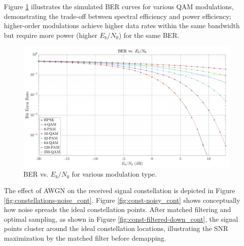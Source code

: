 Figure \ref{fig:ber-mod_cont} illustrates the simulated BER curves for various QAM modulations, demonstrating the trade-off between spectral efficiency and power efficiency; higher-order modulations achieve higher data rates within the same bandwidth but require more power (higher $E_b/N_0$) for the same BER.

\begin{figure}[H]
    \centering
    \includegraphics[width=0.9\linewidth]{Images/ber-mod.png}
    \caption{BER vs. $E_b/N_0$ for various modulation type.}
    \label{fig:ber-mod_cont}
\end{figure}

The effect of AWGN on the received signal constellation is depicted in Figure \ref{fig:constellations-noise_cont}. Figure \ref{fig:const-noisy_cont} shows conceptually how noise spreads the ideal constellation points. After matched filtering and optimal sampling, as shown in Figure \ref{fig:const-filtered-down_cont}, the signal points cluster around the ideal constellation locations, illustrating the SNR maximization by the matched filter before demapping.

